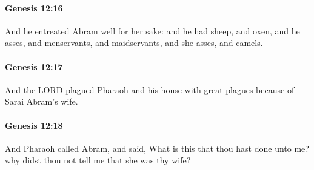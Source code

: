 		\paragraph{Genesis 12:16} %
			\label{GENESIS-12-16}

			And he entreated Abram well for her sake: and he had sheep, and oxen, and he asses, and menservants, and maidservants, and she asses, and camels.


		\paragraph{Genesis 12:17} %
			\label{GENESIS-12-17}

			And the LORD plagued Pharaoh and his house with great plagues because of Sarai Abram's wife.


		\paragraph{Genesis 12:18} %
			\label{GENESIS-12-18}

			And Pharaoh called Abram, and said, What is this that thou hast done unto me?  why didst thou not tell me that she was thy wife?


